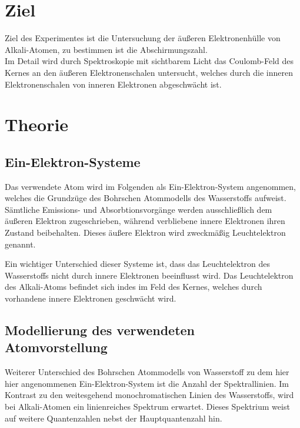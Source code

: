 \section*{Ziel}
Ziel des Experimentes ist die Untersuchung der äußeren Elektronenhülle von Alkali-Atomen, zu bestimmen ist die Abschirmungszahl.\\
Im Detail wird durch Spektroskopie mit sichtbarem Licht das Coulomb-Feld des Kernes an den äußeren Elektronenschalen untersucht,
welches durch die inneren Elektronenschalen von inneren Elektronen abgeschwächt ist.

\section{Theorie}
\label{sec:Theorie}
\subsection{Ein-Elektron-Systeme} %
\label{sub:1e}
Das verwendete Atom wird im Folgenden als Ein-Elektron-System angenommen, welches die Grundzüge des Bohrschen Atommodells des Wasserstoffs aufweist.
Sämtliche Emissions- und Absorbtionsvorgänge werden ausschließlich dem äußeren Elektron zugeschrieben, während verbliebene innere Elektronen ihren Zustand beibehalten.
Dieses äußere Elektron wird zweckmäßig Leuchtelektron genannt.

Ein wichtiger Unterschied dieser Systeme ist, dass das Leuchtelektron des Wasserstoffs nicht durch innere Elektronen beeinflusst wird.
Das Leuchtelektron des Alkali-Atoms befindet sich indes im Feld des Kernes, welches durch vorhandene innere Elektronen geschwächt wird.

\subsection{Modellierung des verwendeten Atomvorstellung} %
\label{sub:L_quantenzahl}
Weiterer Unterschied des Bohrschen Atommodells von Wasserstoff zu dem hier hier angenommenen Ein-Elektron-System ist die Anzahl der Spektrallinien. 
Im Kontrast zu den weitesgehend monochromatischen Linien des Wasserstoffs, wird bei Alkali-Atomen ein linienreiches Spektrum erwartet.
Dieses Spektrium weist auf weitere Quantenzahlen nebst der Hauptquantenzahl hin.

